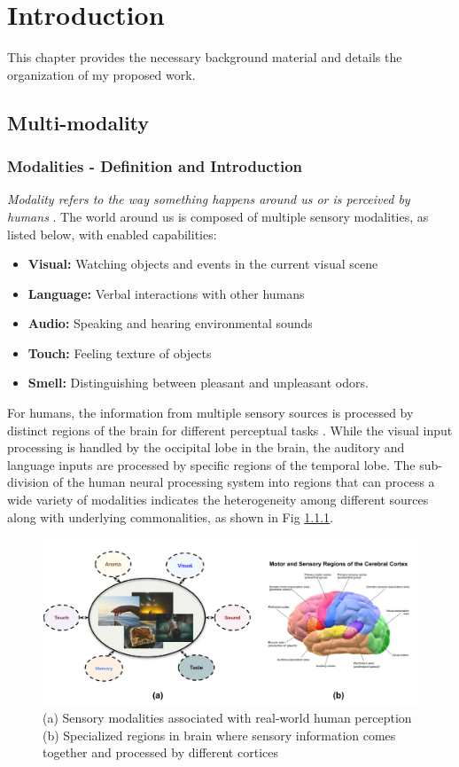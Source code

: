 \chapter{Introduction}
\label{cha:introduction}
This chapter provides the necessary background material and details the organization of my proposed work.

\section{Multi-modality}
\subsection{Modalities - Definition and Introduction}
\textit{Modality refers to the way something happens around us or is perceived by humans} \cite{Baltruaitis2017MultimodalML}. The world around us is composed of multiple sensory modalities, as listed below, with enabled capabilities:
\begin{itemize}
    \item \textbf{Visual:} Watching objects and events in the current visual scene
    \item \textbf{Language:} Verbal interactions with other humans 
    \item \textbf{Audio:} Speaking and hearing environmental sounds 
    \item \textbf{Touch:} Feeling texture of objects 
    \item \textbf{Smell:} Distinguishing between pleasant and unpleasant odors.
\end{itemize}
For humans, the information from multiple sensory sources is processed by distinct regions of the brain for different perceptual tasks \cite{Alain2001WhatA,BornkesselSchlesewsky2015NeurobiologicalRO,Wallace2002HistochemicalIO}. While the visual input processing is handled by the occipital lobe in the brain, the auditory and language inputs are processed by specific regions of the temporal lobe. The sub-division of the human neural processing system into regions that can process a wide variety of modalities indicates the heterogeneity among different sources along with underlying commonalities, as shown in Fig \ref{}.

\begin{figure}
    \includegraphics[width=\textwidth]{figures/cererbral_cortex_multiple_modalities.png}
    \caption{ (a)  Sensory modalities associated with real-world human perception  (b)  Specialized regions in brain where sensory information comes together and processed by different cortices}
\end{figure}

